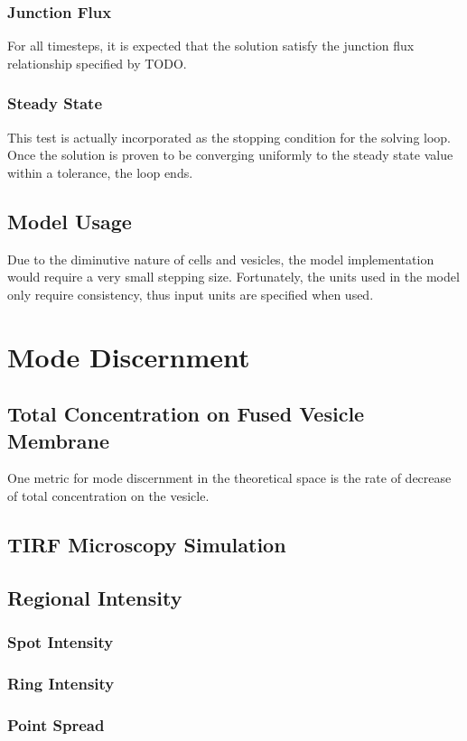\documentclass{report}
\begin{document}
\section{Junction Flux}
For all timesteps, it is expected that the solution satisfy the junction flux relationship specified by TODO.

\section{Steady State}
This test is actually incorporated as the stopping condition for the solving loop. Once the solution is proven to be converging uniformly to the steady state value within a tolerance, the loop ends.

\chapter{Model Usage}
Due to the diminutive nature of cells and vesicles, the model implementation would require a very small stepping size. Fortunately, the units used in the model only require consistency, thus input units are specified when used.

\part{Mode Discernment}
\chapter{Total Concentration on Fused Vesicle Membrane}
One metric for mode discernment in the theoretical space is the rate of decrease of total concentration on the vesicle.

\chapter{TIRF Microscopy Simulation}
\chapter{Regional Intensity}
\section{Spot Intensity}
\section{Ring Intensity}
\section{Point Spread}
\end{document}
